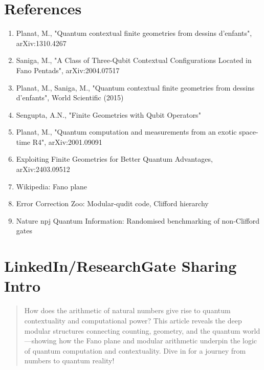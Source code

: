 \documentclass[11pt]{article}
\begin{document}
\section*{References}
\begin{enumerate}
    \item Planat, M., "Quantum contextual finite geometries from dessins d'enfants", arXiv:1310.4267
    \item Saniga, M., "A Class of Three-Qubit Contextual Configurations Located in Fano Pentads", arXiv:2004.07517
    \item Planat, M., Saniga, M., "Quantum contextual finite geometries from dessins d'enfants", World Scientific (2015)
    \item Sengupta, A.N., "Finite Geometries with Qubit Operators"
    \item Planat, M., "Quantum computation and measurements from an exotic space-time R4", arXiv:2001.09091
    \item Exploiting Finite Geometries for Better Quantum Advantages, arXiv:2403.09512
    \item Wikipedia: Fano plane
    \item Error Correction Zoo: Modular-qudit code, Clifford hierarchy
    \item Nature npj Quantum Information: Randomised benchmarking of non-Clifford gates
\end{enumerate}

\section*{LinkedIn/ResearchGate Sharing Intro}
\begin{quote}
How does the arithmetic of natural numbers give rise to quantum contextuality and computational power? This article reveals the deep modular structures connecting counting, geometry, and the quantum world---showing how the Fano plane and modular arithmetic underpin the logic of quantum computation and contextuality. Dive in for a journey from numbers to quantum reality!
\end{quote}
\end{document}

